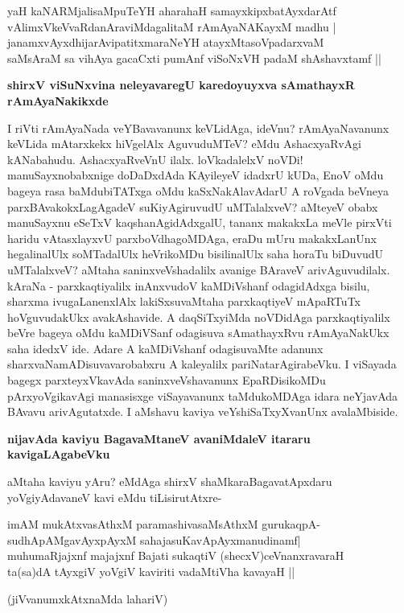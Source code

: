 \begin{shloka}
yaH kaNARMjalisaMpuTeYH aharahaH samayxkipxbatAyxdarAtf\\\label{238}
vAlimxVkeVvaRdanAraviMdagalitaM rAmAyaNAKayxM madhu |\\
janamxvAyxdhijarAvipatitxmaraNeYH atayxMtasoVpadarxvaM \\
saMsAraM sa vihAya gacaCxti pumAnf viSoNxVH padaM shAshavxtamf ||
\end{shloka}

{\bigskip
\noindent
{\large\bf shirxV viSuNxvina neleyavaregU karedoyuyxva sAmathayxR rAmAyaNakikxde}}\label{page238b}
\medskip

\noindent
I riVti rAmAyaNada veYBavavanunx keVLidAga, ideVnu? rAmAyaNavanunx keVLida mAtarxkekx hiVgelAlx AguvuduMTeV? eMdu AshacxyaRvAgi kANabahudu. AshacxyaRveVnU ilalx. loVkadalelxV noVDi! manuSayxnobabxnige doDaDxdAda KAyileyeV idadxrU kUDa, EnoV oMdu bageya rasa baMdubiTATxga oMdu kaSxNakAlavAdarU A roVgada beVneya parxBAvakokxLagAgadeV suKiyAgiruvudU uMTalalxveV? aMteyeV obabx manuSayxnu eSeTxV kaqshanAgidAdxgalU, tananx makakxLa meVle pirxVti haridu vAtasxlayxvU parxboVdhagoMDAga, eraDu mUru makakxLanUnx hegalinalUlx soMTadalUlx heVrikoMDu bisilinalUlx saha horaTu biDuvudU uMTalalxveV? aMtaha saninxveVshadalilx avanige BAraveV arivAguvudilalx. kAraNa - parxkaqtiyalilx inAnxvudoV kaMDiVshanf odagidAdxga bisilu, sharxma ivugaLanenxlAlx lakiSxsuvaMtaha parxkaqtiyeV mApaRTuTx hoVguvudakUkx avakAshavide. A daqSiTxyiMda noVDidAga parxkaqtiyalilx beVre bageya oMdu kaMDiVSanf odagisuva sAmathayxRvu rAmAyaNakUkx saha idedxV ide. Adare A kaMDiVshanf odagisuvaMte adanunx sharxvaNamADisuvavarobabxru A kaleyalilx pariNatarAgirabeVku. I viSayada bagegx parxteyxVkavAda saninxveVshavanunx EpaRDisikoMDu pArxyoVgikavAgi manasisxge viSayavanunx taMdukoMDAga idara neYjavAda BAvavu arivAgutatxde. I aMshavu kaviya veYshiSaTxyXvanUnx avalaMbiside.

\newpage
{\noindent
{\large\bf nijavAda kaviyu BagavaMtaneV avaniMdaleV itararu kavigaLAgabeVku}}\label{page239}
\medskip

\noindent
aMtaha kaviyu yAru? eMdAga shirxV shaMkaraBagavatApxdaru yoVgiyAdavaneV kavi eMdu tiLisirutAtxre-

\begin{shloka}
imAM mukAtxvasAthxM paramashivasaMsAthxM gurukaqpA-\\\label{239a}
sudhApAMgavAyxpAyxM sahajasuKavApAyxmanudinamf|\\
muhumaRjajxnf majajxnf Bajati sukaqtiV (shecxV)ceVnanxravaraH\\
ta(sa)dA tAyxgiV yoVgiV kaviriti vadaMtiVha kavayaH ||

\hfill{(jiVvanumxkAtxnaMda lahariV)}
\end{shloka}

